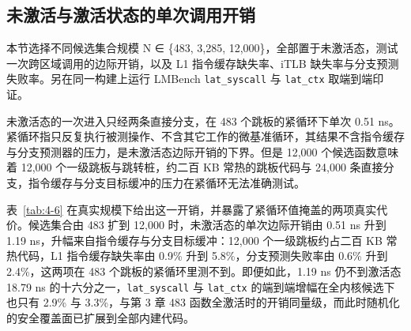 \subsection{未激活与激活状态的单次调用开销}

本节选择不同候选集合规模 N ∈ \{483, 3,285, 12,000\}，全部置于未激活态，测试一次跨区域调用的边际开销，以及 L1 指令缓存缺失率、iTLB 缺失率与分支预测失败率。另在同一构建上运行 LMBench \lstinline[breaklines=false]@lat_syscall@ 与 \lstinline[breaklines=false]@lat_ctx@ 取端到端印证。

未激活态的一次进入只经两条直接分支，在 483 个跳板的紧循环下单次 0.51 ns。紧循环指只反复执行被测操作、不含其它工作的微基准循环，其结果不含指令缓存与分支预测器的压力，是未激活态边际开销的下界。但是 12,000 个候选函数意味着 12,000 个一级跳板与跳转桩，约二百 KB 常热的跳板代码与 24,000 条直接分支，指令缓存与分支目标缓冲的压力在紧循环无法准确测试。

表~\ref{tab:4-6} 在真实规模下给出这一开销，并暴露了紧循环值掩盖的两项真实代价。候选集合由 483 扩到 12,000 时，未激活态的单次边际开销由 0.51 ns 升到 1.19 ns，升幅来自指令缓存与分支目标缓冲：12,000 个一级跳板约占二百 KB 常热代码，L1 指令缓存缺失率由 0.9\% 升到 5.8\%，分支预测失败率由 0.6\% 升到 2.4\%，这两项在 483 个跳板的紧循环里测不到。即便如此，1.19 ns 仍不到激活态 18.79 ns 的十六分之一，\lstinline[breaklines=false]@lat_syscall@ 与 \lstinline[breaklines=false]@lat_ctx@ 的端到端增幅在全内核候选下也只有 2.9\% 与 3.3\%，与第 3 章 483 函数全激活时的开销同量级，而此时随机化的安全覆盖面已扩展到全部内建代码。

